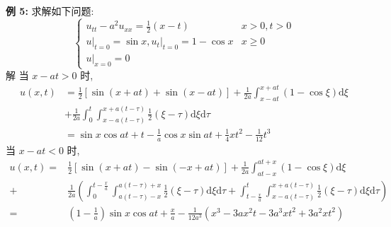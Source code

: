  \textbf{例 5:} 求解如下问题:
$$
\left\{\begin{array}{ll}
u_{t t}-a^{2} u_{x x}=\frac{1}{2}(x-t) & x>0, t>0 \\
\left.u\right|_{t=0}=\sin x,\left.u_{t}\right|_{t=0}=1-\cos x & x \geqslant 0 \\
\left.u\right|_{x=0}=0 &
\end{array}\right.
$$
解 当 $ x-a t>0 $ 时,
$$
\begin{aligned}
u(x, t) & =\frac{1}{2}[\sin (x+a t)+\sin (x-a t)]+\frac{1}{2 a} \int_{x-a t}^{x+a t}(1-\cos \xi) \mathrm{d} \xi \\
& +\frac{1}{2 a} \int_{0}^{t} \int_{x-a(t-\tau)}^{x+a(t-\tau)} \frac{1}{2}(\xi-\tau) \mathrm{d} \xi \mathrm{d} \tau \\
& =\sin x \cos a t+t-\frac{1}{a} \cos x \sin a t+\frac{1}{4} x t^{2}-\frac{1}{12} t^{3}
\end{aligned}
$$
当 $ x-a t<0 $ 时,
$$
\begin{aligned}
u(x, t)= & \frac{1}{2}[\sin (x+a t)-\sin (-x+a t)]+\frac{1}{2 a} \int_{a t-x}^{a t+x}(1-\cos \xi) \mathrm{d} \xi \\
+ & \frac{1}{2 a}\left(\int_{0}^{t-\frac{x}{a}} \int_{a(t-\tau)-x}^{a(t-\tau)+x} \frac{1}{2}(\xi-\tau) \mathrm{d} \xi \mathrm{d} \tau+\right.  \left.\int_{t-\frac{x}{a}}^{t} \int_{x-a(t-\tau)}^{x+a(t-\tau)} \frac{1}{2}(\xi-\tau) \mathrm{d} \xi \mathrm{d} \tau\right) \\
= & \left(1-\frac{1}{a}\right) \sin x \cos a t+\frac{x}{a}-\frac{1}{12 a^{3}}\left(x^{3}-3 a x^{2} t-3 a^{3} x t^{2}+3 a^{2} x t^{2}\right)
\end{aligned}
$$
